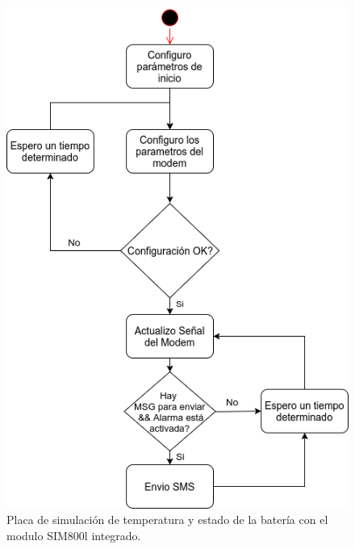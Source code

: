 \begin{figure}[h]
  \centering
  \includegraphics[scale=.4]{./Figures/modem_task.png}
  \caption{Placa de simulación de temperatura y estado de la batería con el modulo SIM800l integrado.}
  \label{fig:modem_task}
\end{figure}



%
%
%	
%
%
%
%
%
%
%	
%		
%
%		
%		
%		
%		
%


